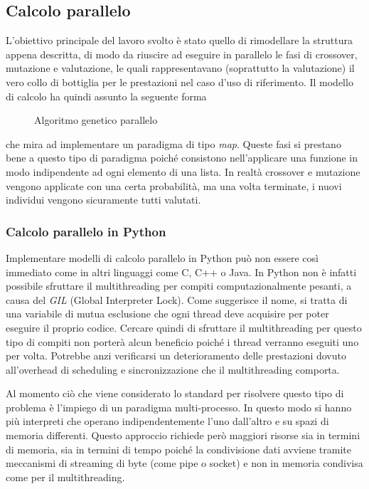 \subsection{Calcolo parallelo}

L'obiettivo principale del lavoro svolto è stato quello di rimodellare la
struttura appena descritta, di modo da riuscire ad eseguire in parallelo le
fasi di crossover, mutazione e valutazione, le quali rappresentavano
(soprattutto la valutazione) il vero collo di bottiglia per le prestazioni nel
caso d'uso di riferimento. Il modello di calcolo ha quindi assunto la seguente
forma
\begin{figure}
    \centering
    
    \caption{Algoritmo genetico parallelo}
    \label{fig: parallel_ga}
\end{figure}
che mira ad implementare un paradigma di tipo \textit{map}. Queste fasi
si prestano bene a questo tipo di paradigma poiché consistono
nell'applicare una funzione in modo indipendente ad ogni elemento di una
lista. In realtà crossover e mutazione vengono applicate con una certa
probabilità, ma una volta terminate, i nuovi individui vengono
sicuramente tutti valutati.

\subsubsection{Calcolo parallelo in Python}

Implementare modelli di calcolo parallelo in Python può non essere così
immediato come in altri linguaggi come C, C++ o Java. In Python non è infatti
possibile sfruttare il multithreading per compiti computazionalmente pesanti,
a causa del \textit{GIL} (Global Interpreter Lock). Come suggerisce il nome,
si tratta di una variabile di mutua esclusione che ogni thread deve acquisire
per poter eseguire il proprio codice. Cercare quindi di sfruttare il
multithreading per questo tipo di compiti non porterà alcun beneficio poiché
i thread verranno eseguiti uno per volta. Potrebbe anzi verificarsi un
deterioramento delle prestazioni dovuto all'overhead di scheduling e
sincronizzazione che il multithreading comporta.

Al momento ciò che viene considerato lo standard per risolvere questo tipo di
problema è l'impiego di un paradigma multi-processo. In questo modo si hanno
più interpreti che operano indipendentemente l'uno dall'altro e su spazi di
memoria differenti. Questo approccio richiede però maggiori risorse sia in
termini di memoria, sia in termini di tempo poiché la condivisione dati avviene
tramite meccanismi di streaming di byte (come pipe o socket) e non in memoria
condivisa come per il multithreading.

